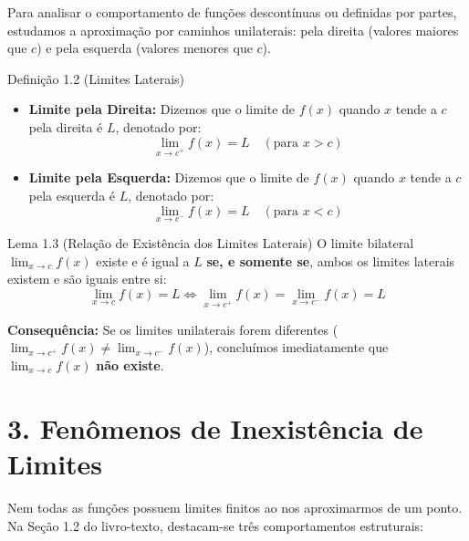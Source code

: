 \documentclass[12pt,a4paper]{article}
\begin{document}
Para analisar o comportamento de funções descontínuas ou definidas por partes, estudamos a aproximação por caminhos unilaterais: pela direita (valores maiores que $c$) e pela esquerda (valores menores que $c$).

\begin{definicao}{Definição 1.2 (Limites Laterais)}
    \begin{itemize}[leftmargin=*]
        \item \textbf{Limite pela Direita:} Dizemos que o limite de $f(x)$ quando $x$ tende a $c$ pela direita é $L$, denotado por:
        $$\lim_{x \to c^+} f(x) = L \quad (\text{para } x > c)$$
        \item \textbf{Limite pela Esquerda:} Dizemos que o limite de $f(x)$ quando $x$ tende a $c$ pela esquerda é $L$, denotado por:
        $$\lim_{x \to c^-} f(x) = L \quad (\text{para } x < c)$$
    \end{itemize}
\end{definicao}

\vspace{0.2cm}

\begin{definicao}{Lema 1.3 (Relação de Existência dos Limites Laterais)}
    O limite bilateral $\lim_{x \to c} f(x)$ existe e é igual a $L$ \textbf{se, e somente se}, ambos os limites laterais existem e são iguais entre si:
    $$\lim_{x \to c} f(x) = L \iff \lim_{x \to c^+} f(x) = \lim_{x \to c^-} f(x) = L$$
\end{definicao}

\vspace{0.2cm}
\textbf{Consequência:} Se os limites unilaterais forem diferentes ($\lim_{x \to c^+} f(x) \neq \lim_{x \to c^-} f(x)$), concluímos imediatamente que $\lim_{x \to c} f(x)$ \textbf{não existe}.

\vspace{0.4cm}

\section*{3. Fenômenos de Inexistência de Limites}

Nem todas as funções possuem limites finitos ao nos aproximarmos de um ponto. Na Seção 1.2 do livro-texto, destacam-se três comportamentos estruturais:
\end{document}
